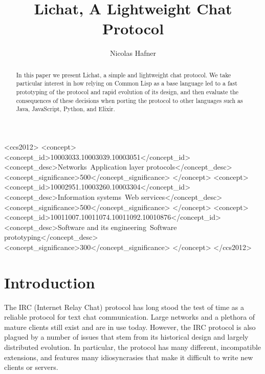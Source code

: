 \documentclass[format=sigconf]{acmart}
\begin{document}
\title{Lichat, A Lightweight Chat Protocol}

\author{Nicolas Hafner}

\begin{abstract}
  In this paper we present Lichat, a simple and lightweight chat protocol. We take particular interest in how relying on Common Lisp as a base language led to a fast prototyping of the protocol and rapid evolution of its design, and then evaluate the consequences of these decisions when porting the protocol to other languages such as Java, JavaScript, Python, and Elixir.
\end{abstract}

\begin{CCSXML}
  <ccs2012>
  <concept>
  <concept_id>10003033.10003039.10003051</concept_id>
  <concept_desc>Networks~Application layer protocols</concept_desc>
  <concept_significance>500</concept_significance>
  </concept>
  <concept>
  <concept_id>10002951.10003260.10003304</concept_id>
  <concept_desc>Information systems~Web services</concept_desc>
  <concept_significance>500</concept_significance>
  </concept>
  <concept>
  <concept_id>10011007.10011074.10011092.10010876</concept_id>
  <concept_desc>Software and its engineering~Software prototyping</concept_desc>
  <concept_significance>300</concept_significance>
  </concept>
  </ccs2012>
\end{CCSXML}



\maketitle

\newpage

\def\abovecaptionskip{1pt}
\def\listingautorefname{Listing}
\def\figureautorefname{Figure}

\section{Introduction}\label{introduction}
The IRC (Internet Relay Chat) protocol has long stood the test of time as a reliable protocol for text chat communication. Large networks and a plethora of mature clients still exist and are in use today. However, the IRC protocol is also plagued by a number of issues that stem from its historical design and largely distributed evolution. In particular, the protocol has many different, incompatible extensions, and features many idiosyncrasies that make it difficult to write new clients or servers.
\end{document}
